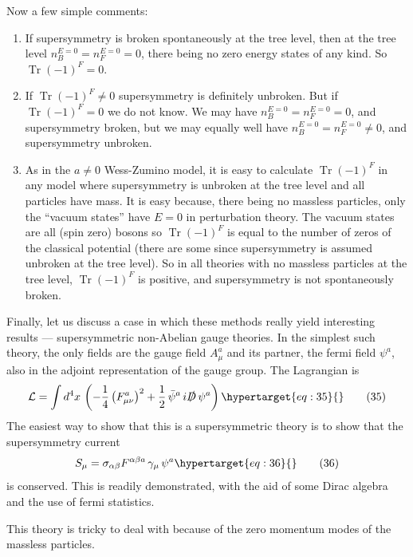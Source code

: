 \documentclass[11pt,a4paper]{article}
\newcommand{\eqtarget}[1]{\hypertarget{eq:#1}{\mathstrut}\tag{#1}}
\begin{document}
Now a few simple comments:
\begin{enumerate}[(1)]
\item If supersymmetry is broken spontaneously at the tree level,
then at the tree level $n_B^{E=0} = n_F^{E=0} = 0$, there being no zero energy
states of any kind. So $\operatorname{Tr}(-1)^F = 0$.

\item If $\operatorname{Tr}(-1)^F \neq 0$ supersymmetry is definitely unbroken. But
if $\operatorname{Tr}(-1)^F = 0$ we do not know. We may have $n_B^{E=0} = n_F^{E=0} = 0$, and
supersymmetry broken, but we may equally well have $n_B^{E=0} = n_F^{E=0} \neq 0$,
and supersymmetry unbroken.

\item As in the $a \neq 0$ Wess-Zumino model, it is easy to calculate
$\operatorname{Tr}(-1)^F$ in any model where supersymmetry is unbroken at the tree
level and all particles have mass. It is easy because, there being
no massless particles, only the ``vacuum states'' have $E = 0$ in perturbation
theory. The vacuum states are all (spin zero) bosons so
$\operatorname{Tr}(-1)^F$ is equal to the number of zeros of the classical potential
(there are some since supersymmetry is assumed unbroken at the tree
level). So in all theories with no massless particles at the tree
level, $\operatorname{Tr}(-1)^F$ is positive, and supersymmetry is not spontaneously
broken.
\end{enumerate}

Finally, let us discuss a case in which these methods really
yield interesting results --- supersymmetric non-Abelian gauge theories.
In the simplest such theory, the only fields are the gauge
field $A_\mu^a$ and its partner, the fermi field $\psi^a$, also in the adjoint
representation of the gauge group. The Lagrangian is
\begin{equation}
\mathcal{L} = \int d^4x\, \left(- \frac{1}{4}\left(F_{\mu\nu}^a\right)^2 + \frac{1}{2}\,\bar\psi^a\, i \slashed{D}\, \psi^a\right)
\eqtarget{35}
\end{equation}
The easiest way to show that this is a supersymmetric theory is to
show that the supersymmetry current
\begin{equation}
S_\mu = \sigma_{\alpha\beta} F^{\alpha\beta a}\, \gamma_\mu\, \psi^a
\eqtarget{36}
\end{equation}
is conserved. This is readily demonstrated, with the aid of some
Dirac algebra and the use of fermi statistics.

This theory is tricky to deal with because of the zero momentum
modes of the massless particles.
\end{document}

